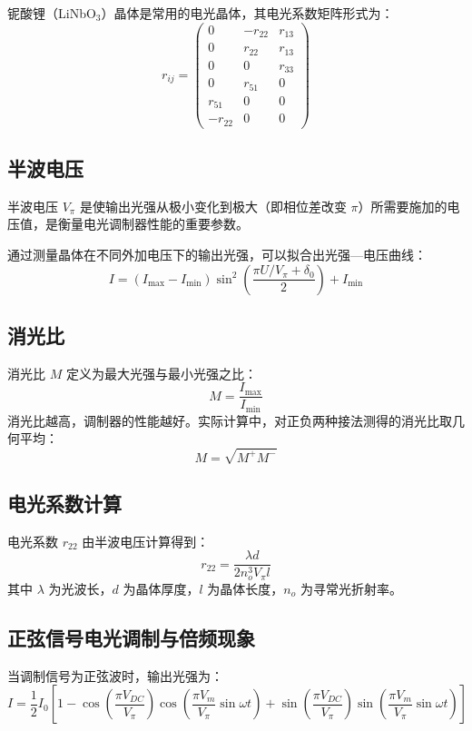 \documentclass[12pt,a4paper]{article}
\begin{document}
铌酸锂（LiNbO\(_3\)）晶体是常用的电光晶体，其电光系数矩阵形式为：
\begin{equation}
    r_{ij} =
    \begin{pmatrix}
        0 & -r_{22} & r_{13} \\
        0 & r_{22} & r_{13} \\
        0 & 0 & r_{33} \\
        0 & r_{51} & 0 \\
        r_{51} & 0 & 0 \\
        -r_{22} & 0 & 0
    \end{pmatrix}
\end{equation}

\subsection{半波电压}
半波电压 \(V_\pi\) 是使输出光强从极小变化到极大（即相位差改变 \(\pi\)）所需要施加的电压值，是衡量电光调制器性能的重要参数。

通过测量晶体在不同外加电压下的输出光强，可以拟合出光强—电压曲线：
\begin{equation}
    I = (I_{\max} - I_{\min}) \sin^2\left(\frac{\pi U/V_\pi + \delta_0}{2}\right) + I_{\min}
\end{equation}

\subsection{消光比}
消光比 \(M\) 定义为最大光强与最小光强之比：
\begin{equation}
    M = \frac{I_{\max}}{I_{\min}}
\end{equation}
消光比越高，调制器的性能越好。实际计算中，对正负两种接法测得的消光比取几何平均：
\begin{equation}
    M = \sqrt{M^+ M^-}
\end{equation}

\subsection{电光系数计算}
电光系数 \(r_{22}\) 由半波电压计算得到：
\begin{equation}
    r_{22} = \frac{\lambda d}{2 n_o^3 V_\pi l}
\end{equation}
其中 \(\lambda\) 为光波长，\(d\) 为晶体厚度，\(l\) 为晶体长度，\(n_o\) 为寻常光折射率。

\subsection{正弦信号电光调制与倍频现象}
当调制信号为正弦波时，输出光强为：
\begin{equation}
    I = \frac{1}{2} I_0 \left[ 1 - \cos\left(\frac{\pi V_{DC}}{V_\pi}\right) \cos\left(\frac{\pi V_m}{V_\pi} \sin\omega t\right) + \sin\left(\frac{\pi V_{DC}}{V_\pi}\right) \sin\left(\frac{\pi V_m}{V_\pi} \sin\omega t\right) \right]
\end{equation}
\end{document}
